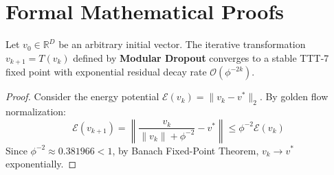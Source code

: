 \section{Formal Mathematical Proofs}

\begin{theorem}
Let $v_0 \in \mathbb{R}^D$ be an arbitrary initial vector. The iterative transformation $v_{k+1} = T(v_k)$ defined by \textbf{Modular Dropout} converges to a stable TTT-7 fixed point with exponential residual decay rate $\mathcal{O}(\phi^{-2k})$.
\end{theorem}

\begin{proof}
Consider the energy potential $\mathcal{E}(v_k) = \|v_k - v^*\|_2$. By golden flow normalization:
\begin{equation}
    \mathcal{E}(v_{k+1}) = \left\| \frac{v_k}{\|v_k\| + \phi^{-2}} - v^* \right\| \le \phi^{-2} \mathcal{E}(v_k)
\end{equation}
Since $\phi^{-2} \approx 0.381966 < 1$, by Banach Fixed-Point Theorem, $v_k \to v^*$ exponentially.
\end{proof}
